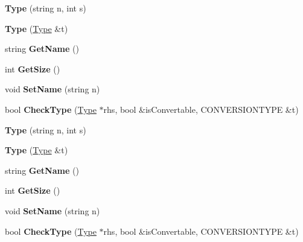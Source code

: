 \begin{DoxyCompactItemize}
\item 
\hypertarget{classType_a0ec88e19865012d53e20b97677218783}{{\bfseries Type} (string n, int s)}\label{classType_a0ec88e19865012d53e20b97677218783}

\item 
\hypertarget{classType_a617481e51492ea14507c83d5dba2cce5}{{\bfseries Type} (\hyperlink{classType}{Type} \&t)}\label{classType_a617481e51492ea14507c83d5dba2cce5}

\item 
\hypertarget{classType_a8143fe4686ae1a5709a5955396c6ee26}{string {\bfseries Get\-Name} ()}\label{classType_a8143fe4686ae1a5709a5955396c6ee26}

\item 
\hypertarget{classType_afe0fca035825759785b525d2a24f69fe}{int {\bfseries Get\-Size} ()}\label{classType_afe0fca035825759785b525d2a24f69fe}

\item 
\hypertarget{classType_ab8d2328a3a76289edf42b9bf0d4f278f}{void {\bfseries Set\-Name} (string n)}\label{classType_ab8d2328a3a76289edf42b9bf0d4f278f}

\item 
\hypertarget{classType_a2574b17ddc03d5ca13309811d06f1a56}{bool {\bfseries Check\-Type} (\hyperlink{classType}{Type} $\ast$rhs, bool \&is\-Convertable, C\-O\-N\-V\-E\-R\-S\-I\-O\-N\-T\-Y\-P\-E \&t)}\label{classType_a2574b17ddc03d5ca13309811d06f1a56}

\item 
\hypertarget{classType_a0ec88e19865012d53e20b97677218783}{{\bfseries Type} (string n, int s)}\label{classType_a0ec88e19865012d53e20b97677218783}

\item 
\hypertarget{classType_a617481e51492ea14507c83d5dba2cce5}{{\bfseries Type} (\hyperlink{classType}{Type} \&t)}\label{classType_a617481e51492ea14507c83d5dba2cce5}

\item 
\hypertarget{classType_a8143fe4686ae1a5709a5955396c6ee26}{string {\bfseries Get\-Name} ()}\label{classType_a8143fe4686ae1a5709a5955396c6ee26}

\item 
\hypertarget{classType_afe0fca035825759785b525d2a24f69fe}{int {\bfseries Get\-Size} ()}\label{classType_afe0fca035825759785b525d2a24f69fe}

\item 
\hypertarget{classType_ab8d2328a3a76289edf42b9bf0d4f278f}{void {\bfseries Set\-Name} (string n)}\label{classType_ab8d2328a3a76289edf42b9bf0d4f278f}

\item 
\hypertarget{classType_a2574b17ddc03d5ca13309811d06f1a56}{bool {\bfseries Check\-Type} (\hyperlink{classType}{Type} $\ast$rhs, bool \&is\-Convertable, C\-O\-N\-V\-E\-R\-S\-I\-O\-N\-T\-Y\-P\-E \&t)}\label{classType_a2574b17ddc03d5ca13309811d06f1a56}

\end{DoxyCompactItemize}
